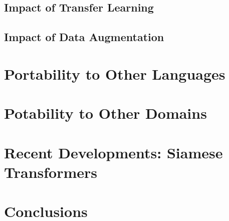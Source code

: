 \subsection{Impact of Transfer Learning}

\subsection{Impact of Data Augmentation}



\section{Portability to Other Languages}

\section{Potability to Other Domains}

\section{Recent Developments: Siamese Transformers}

\section{Conclusions}